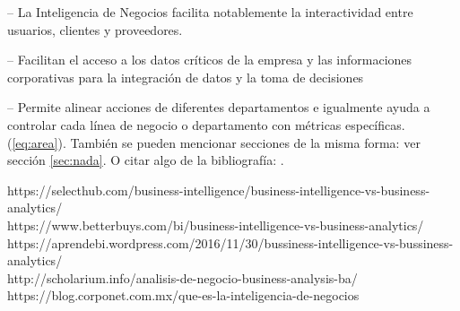  – La Inteligencia de Negocios facilita notablemente la interactividad entre usuarios, clientes y proveedores.

 – Facilitan el acceso a los datos críticos de la empresa y las informaciones corporativas para la integración de datos y la toma de decisiones

 – Permite alinear acciones de diferentes departamentos e igualmente ayuda a controlar cada línea de negocio o departamento con métricas específicas.
 \\

(\ref{eq:area}).
También se pueden mencionar secciones de la misma forma: ver sección
\ref{sec:nada}. O citar algo de la bibliografía: \cite{Cd94}.

\newpage
\begin{thebibliography}{99}

 https://selecthub.com/business-intelligence/business-intelligence-vs-business-analytics/
\\
 https://www.betterbuys.com/bi/business-intelligence-vs-business-analytics/
\\
 https://aprendebi.wordpress.com/2016/11/30/bussiness-intelligence-vs-bussiness-analytics/
\\
 http://scholarium.info/analisis-de-negocio-business-analysis-ba/
\\
 https://blog.corponet.com.mx/que-es-la-inteligencia-de-negocios
\\



\end{thebibliography}


